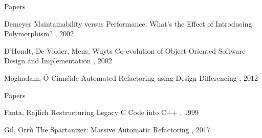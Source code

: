 \documentclass{beamer}
\begin{document}
\begin{frame}{Papers}
  \begin{thebibliography}{10}
    \beamertemplatearticlebibitems
    
      Demeyer
      \newblock Maintainability versus Performance: What's the Effect of Introducing Polymorphism?
      , 2002
    
      D'Hondt, De Volder, Mens, Wuyts
      \newblock Co-evolution of Object-Oriented Software Design and Implementation
      , 2002
    
      Moghadam, Ó Cinnéide
      \newblock Automated Refactoring using Design Differencing
      , 2012
  \end{thebibliography}
\end{frame}

\begin{frame}{Papers}
  \begin{thebibliography}{10}
    \beamertemplatearticlebibitems
    
      Fanta, Rajlich
      \newblock Restructuring Legacy C Code into C++
      , 1999
    
      Gil, Orrù
      \newblock The Spartanizer: Massive Automatic Refactoring
      , 2017
  \end{thebibliography}
\end{frame}
\end{document}
